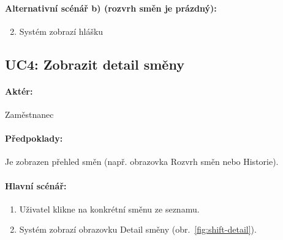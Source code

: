 \documentclass[twoside]{ctuthesis}
\begin{document}
\paragraph{Alternativní scénář b) (rozvrh směn je prázdný):}
\begin{enumerate}[label=\arabic*b]
	\setcounter{enumi}{1}
	\item Systém zobrazí hlášku 
\end{enumerate}

\newpage
\subsection{UC4: Zobrazit detail směny}
\paragraph{Aktér:} Zaměstnanec
\paragraph{Předpoklady:} Je zobrazen přehled směn (např. obrazovka Rozvrh směn nebo Historie).
\paragraph{Hlavní scénář:}
\begin{enumerate}
	\item Uživatel klikne na konkrétní směnu ze seznamu.
	\item Systém zobrazí obrazovku Detail směny (obr.~\ref{fig:shift-detail}).
\end{enumerate}
\end{document}
